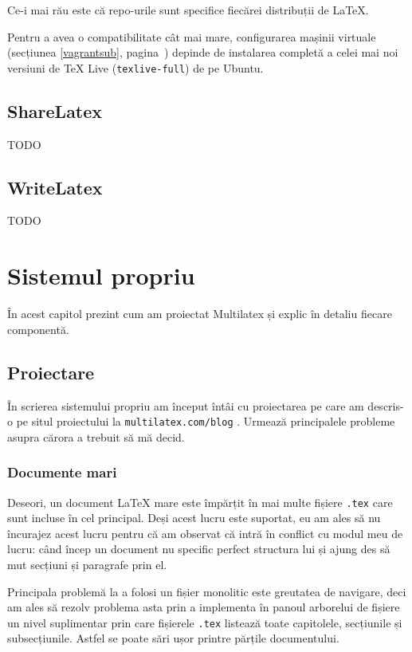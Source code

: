 \documentclass[a4wide,12pt]{report}
\newcommand{\cod}[1]{\texttt{#1}}
\newcommand{\idee}[1]{{\color{red} #1}}
\begin{document}
Ce-i mai rău este că repo-urile sunt specifice fiecărei distribuții de \LaTeX{}.

Pentru a avea o compatibilitate cât mai mare, configurarea mașinii virtuale
(secțiunea \ref{vagrantsub}, pagina~\pageref{vagrantsub}) depinde de instalarea
completă a celei mai noi versiuni de \TeX{} Live (\cod{texlive-full}) de pe
Ubuntu.

\section{ShareLatex}

\idee{TODO}

\section{WriteLatex}

\idee{TODO}

\chapter{Sistemul propriu}

În acest capitol prezint cum am proiectat Multilatex și explic în detaliu
fiecare componentă.

\section{Proiectare}

În scrierea sistemului propriu am început întâi cu proiectarea pe care am
descris-o pe situl proiectului la \cod{multilatex.com/blog} . Urmează
principalele probleme asupra cărora a trebuit să mă decid.

\subsection{Documente mari}

Deseori, un document \LaTeX{} mare este împărțit în mai multe fișiere \cod{.tex}
care sunt incluse în cel principal. Deși acest lucru este suportat, eu am ales
să nu încurajez acest lucru pentru că am observat că intră în conflict cu modul
meu de lucru: când încep un document nu specific perfect structura lui și ajung
des să mut secțiuni și paragrafe prin el.

Principala problemă la a folosi un fișier monolitic este greutatea de navigare,
deci am ales să rezolv problema asta prin a implementa în panoul arborelui de
fișiere un nivel suplimentar prin care fișierele \cod{.tex} listează toate
capitolele, secțiunile și subsecțiunile. Astfel se poate sări ușor printre
părțile documentului.
\end{document}
